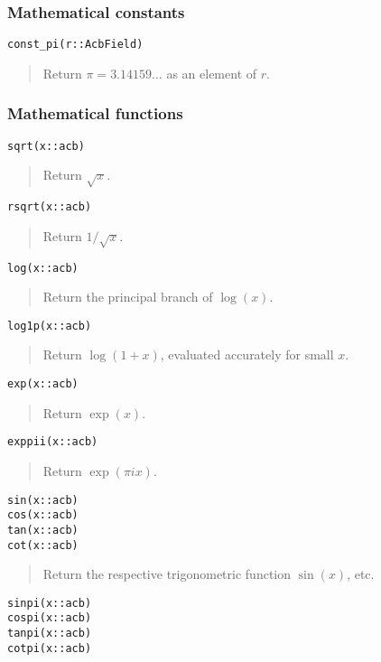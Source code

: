 \documentclass[a4paper,10pt]{article}
\newcommand{\desc}[1]{\vspace{-3mm}\begin{quote}#1\end{quote}}
\begin{document}
{{\subsubsection{Mathematical constants}

\begin{lstlisting}
const_pi(r::AcbField)
\end{lstlisting}

\desc{Return $\pi = 3.14159\ldots$ as an element of $r$.}

\subsubsection{Mathematical functions}

\begin{lstlisting}
sqrt(x::acb)
\end{lstlisting}

\desc{Return $\sqrt{x}$.}

\begin{lstlisting}
rsqrt(x::acb)
\end{lstlisting}

\desc{Return $1 / \sqrt{x}$.}

\begin{lstlisting}
log(x::acb)
\end{lstlisting}

\desc{Return the principal branch of $\log(x)$.}

\begin{lstlisting}
log1p(x::acb)
\end{lstlisting}

\desc{Return $\log(1+x)$, evaluated accurately for small $x$.}

\begin{lstlisting}
exp(x::acb)
\end{lstlisting}

\desc{Return $\exp(x)$.}

\begin{lstlisting}
exppii(x::acb)
\end{lstlisting}

\desc{Return $\exp(\pi i x)$.}

\begin{lstlisting}
sin(x::acb)
cos(x::acb)
tan(x::acb)
cot(x::acb)
\end{lstlisting}

\desc{Return the respective trigonometric function $\sin(x)$, etc.}

\begin{lstlisting}
sinpi(x::acb)
cospi(x::acb)
tanpi(x::acb)
cotpi(x::acb)
\end{lstlisting}

}}
\end{document}
